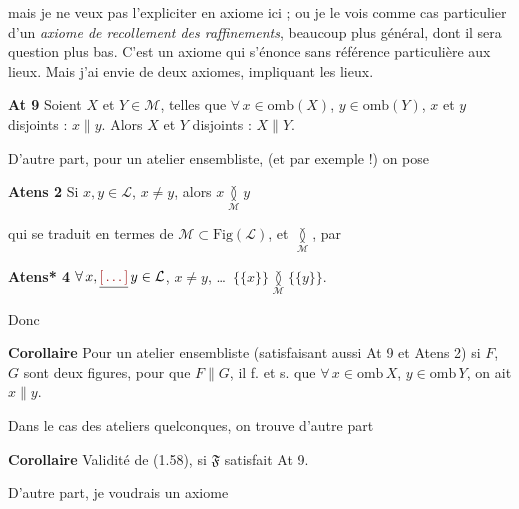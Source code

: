 \documentclass[11pt,a4paper]{article}
\begin{document}

mais je ne veux pas l'expliciter en axiome ici ; ou je le vois comme cas particulier d'un \emph{axiome de recollement des raffinements}, beaucoup plus général, dont il sera question plus bas. C'est un axiome qui s'énonce sans référence particulière aux lieux. Mais j'ai envie de \ill{} deux axiomes, impliquant  les lieux.

\textbf{At 9} Soient $X$ et $Y \in \mathcal{M}$, telles que $\forall\, x \in \mathrm{omb}(X)$, $y \in \mathrm{omb}(Y)$, $x$ et $y$  disjoints :  $x \parallel y$. Alors $X$ et $Y$  \add{\ill{}} disjoints : $X \parallel Y$.

D'autre part, pour un atelier ensembliste, (et par exemple  !) on pose

\textbf{Atens 2} Si $x, y \in \mathcal{L}$, $x \neq y$, alors $x \underset{\mathcal{M}}{\between} y$

qui se traduit en termes de  $\mathcal{M} \subset \mathrm{Fig}(\mathcal{L})$, et $\underset{\mathcal{M}}{\between}$, par

\textbf{Atens* \struck{\ill{}} 4} $\forall\, x, \struck{\ill{}}\, y \in \mathcal{L}$, $x \neq y$, \ldots\ $\lbrace\lbrace x \rbrace\rbrace \underset{\mathcal{M}}{\between} \lbrace\lbrace y \rbrace\rbrace$.

Donc

\textbf{Corollaire} Pour un atelier ensembliste (satisfaisant \struck{\ill{}} aussi At 9 et Atens 2) si $F$, $G$ sont deux figures, pour que $F \parallel G$, il f. et s. que $\forall\, x \in \mathrm{omb}\, X$, $y \in \mathrm{omb}\, Y$, on ait $x \parallel y$. \struck{\ill{}}

Dans le cas des ateliers quelconques, on trouve d'autre part

\textbf{Corollaire} Validité de (1.58), si $\mathfrak{F}$ satisfait At 9.

D'autre part, je voudrais un  \ill{} axiome 
\end{document}
